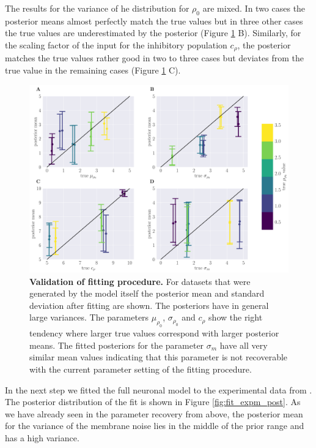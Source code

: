     The results for the variance of he distribution for $\rho_0$ are mixed.
    In two cases the posterior means almost perfectly match the true values but in three other cases the true values are underestimated by the posterior (Figure \ref{fig:fit_validation} B).
    Similarly, for the scaling factor of the input for the inhibitory population $c_{\rho}$, the posterior matches the true values rather good in two to three cases but deviates from the true value in the remaining cases (Figure \ref{fig:fit_validation} C).\\
    \begin{figure}[H]
    	\begin{center}
			\includegraphics[width=\textwidth]{figure_fit_validation.pdf}
    	\end{center}
    	\caption{\textbf{Validation of fitting procedure.} For datasets that were generated by the model itself the posterior mean and standard deviation after fitting are shown. The posteriors have in general large variances. The parameters $\mu_{\rho_{0}}$, $\sigma_{\rho_{0}}$ and $c_{\rho}$ show the right tendency where larger true values correspond with larger posterior means. The fitted posteriors for the parameter $\sigma_{m}$ have all very similar mean values indicating that this parameter is not recoverable with the current parameter setting of the fitting procedure.}
    	\label{fig:fit_validation}
    \end{figure}
    In the next step we fitted the full neuronal model to the experimental data from \cite{Bhattacharyya2017}.
    The posterior distribution of the fit is shown in Figure \ref{fig:fit_expm_post}.
    As we have already seen in the parameter recovery from above, the posterior mean for the variance of the membrane noise lies in the middle of the prior range and has a high variance.
